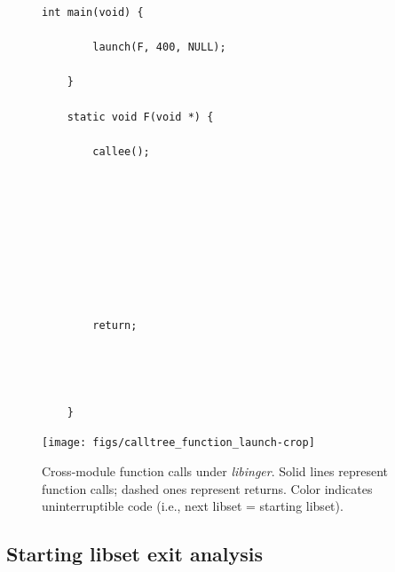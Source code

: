 \begin{figure}
	\begin{minipage}{0.25\textwidth}
	\begin{lstlisting}[basicstyle=\footnotesize\ttfamily,tabsize=2,gobble=2]
	int main(void) {

		launch(F, 400, NULL);

	}

	static void F(void *) {

		callee();









		return;




	}
	\end{lstlisting}
	\end{minipage}
%
	\begin{minipage}{0.75\textwidth}
	\texttt{[image: figs/calltree\_function\_launch-crop]}
	\end{minipage}
\caption[Cross-module function calls under \textit{libinger}]{
Cross-module function calls under \textit{libinger}. Solid lines represent function
calls; dashed ones represent returns. Color indicates uninterruptible code (i.e.,
next libset = starting libset).}
\label{fig:ingerhook}
\end{figure}


\subsection{Starting libset exit analysis}
\label{sec:libinger:exitanalysis}


